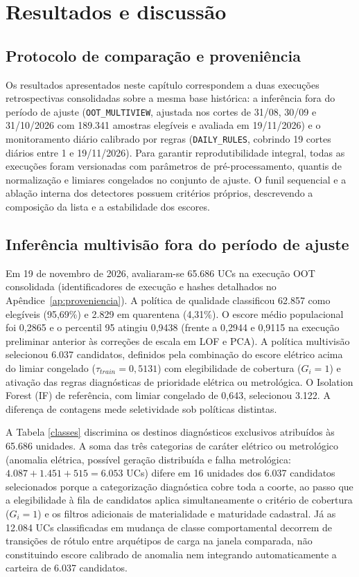 \chapter{Resultados e discussão}\label{resultados-e-discussao}
\section{Protocolo de comparação e proveniência}
Os resultados apresentados neste capítulo correspondem a duas execuções retrospectivas consolidadas sobre a mesma base histórica: a inferência fora do período de ajuste (\texttt{OOT\_MULTIVIEW}, ajustada nos cortes de 31/08, 30/09 e 31/10/2026 com 189.341 amostras elegíveis e avaliada em 19/11/2026) e o monitoramento diário calibrado por regras (\texttt{DAILY\_RULES}, cobrindo 19 cortes diários entre 1\textordmasculine{} e 19/11/2026). Para garantir reprodutibilidade integral, todas as execuções foram versionadas com parâmetros de pré-processamento, quantis de normalização e limiares congelados no conjunto de ajuste. O funil sequencial e a ablação interna dos detectores possuem critérios próprios, descrevendo a composição da lista e a estabilidade dos escores.
\section{Inferência multivisão fora do período de ajuste}
Em 19 de novembro de 2026, avaliaram-se 65.686 UCs na execução OOT consolidada (identificadores de execução e hashes detalhados no Apêndice~\ref{ap:proveniencia}). A política de qualidade classificou 62.857 como elegíveis (95,69\%) e 2.829 em quarentena (4,31\%). O escore médio populacional foi 0,2865 e o percentil 95 atingiu 0,9438 (frente a 0,2944 e 0,9115 na execução preliminar anterior às correções de escala em LOF e PCA). A política multivisão selecionou 6.037 candidatos, definidos pela combinação do escore elétrico acima do limiar congelado ($\tau_{train}=0{,}5131$) com elegibilidade de cobertura ($G_i=1$) e ativação das regras diagnósticas de prioridade elétrica ou metrológica. O Isolation Forest (IF) de referência, com limiar congelado de 0,643, selecionou 3.122. A diferença de contagens mede seletividade sob políticas distintas.

A Tabela \ref{classes} discrimina os destinos diagnósticos exclusivos atribuídos às 65.686 unidades. A soma das três categorias de caráter elétrico ou metrológico (anomalia elétrica, possível geração distribuída e falha metrológica: $4.087 + 1.451 + 515 = 6.053$ UCs) difere em 16 unidades dos 6.037 candidatos selecionados porque a categorização diagnóstica cobre toda a coorte, ao passo que a elegibilidade à fila de candidatos aplica simultaneamente o critério de cobertura ($G_i=1$) e os filtros adicionais de materialidade e maturidade cadastral. Já as 12.084 UCs classificadas em mudança de classe comportamental decorrem de transições de rótulo entre arquétipos de carga na janela comparada, não constituindo escore calibrado de anomalia nem integrando automaticamente a carteira de 6.037 candidatos.

